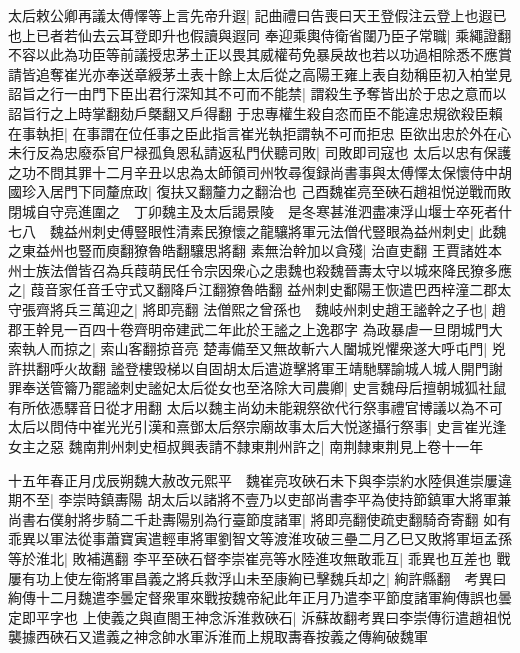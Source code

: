 太后敕公卿再議太傅懌等上言先帝升遐|{
	記曲禮曰告喪曰天王登假注云登上也遐已也上已者若仙去云耳登即升也假讀與遐同}
奉迎乘輿侍衛省闥乃臣子常職|{
	乘繩證翻}
不容以此為功臣等前議授忠茅土正以畏其威權苟免暴戾故也若以功過相除悉不應賞請皆追奪崔光亦奉送章綬茅土表十餘上太后從之高陽王雍上表自劾稱臣初入柏堂見詔旨之行一由門下臣出君行深知其不可而不能禁|{
	謂殺生予奪皆出於于忠之意而以詔旨行之上時掌翻劾戶槩翻又戶得翻}
于忠專權生殺自恣而臣不能違忠規欲殺臣賴在事執拒|{
	在事謂在位任事之臣此指言崔光執拒謂執不可而拒忠}
臣欲出忠於外在心未行反為忠廢忝官尸禄孤負恩私請返私門伏聽司敗|{
	司敗即司寇也}
太后以忠有保護之功不問其罪十二月辛丑以忠為太師領司州牧尋復録尚書事與太傅懌太保懷侍中胡國珍入居門下同釐庶政|{
	復扶又翻釐力之翻治也}
己酉魏崔亮至硤石趙祖悦逆戰而敗閉城自守亮進圍之　丁卯魏主及太后謁景陵　是冬寒甚淮泗盡凍浮山堰士卒死者什七八　魏益州刺史傅豎眼性清素民獠懷之龍驤將軍元法僧代豎眼為益州刺史|{
	此魏之東益州也豎而庾翻獠魯皓翻驤思將翻}
素無治幹加以貪殘|{
	治直吏翻}
王賈諸姓本州士族法僧皆召為兵葭萌民任令宗因衆心之患魏也殺魏晉夀太守以城來降民獠多應之|{
	葭音家任音壬守式又翻降戶江翻獠魯皓翻}
益州刺史鄱陽王恢遣巴西梓潼二郡太守張齊將兵三萬迎之|{
	將即亮翻}
法僧熙之曾孫也　魏岐州刺史趙王謐幹之子也|{
	趙郡王幹見一百四十卷齊明帝建武二年此於王謐之上逸郡字}
為政暴虐一旦閉城門大索執人而掠之|{
	索山客翻掠音亮}
楚毒備至又無故斬六人闔城兇懼衆遂大呼屯門|{
	兇許拱翻呼火故翻}
謐登樓毁梯以自固胡太后遣遊擊將軍王靖馳驛諭城人城人開門謝罪奉送管籥乃罷謐刺史謐妃太后從女也至洛除大司農卿|{
	史言魏母后擅朝城狐社鼠有所依憑驛音日從才用翻}
太后以魏主尚幼未能親祭欲代行祭事禮官博議以為不可太后以問侍中崔光光引漢和熹鄧太后祭宗廟故事太后大悦遂攝行祭事|{
	史言崔光逢女主之惡}
魏南荆州刺史桓叔興表請不隸東荆州許之|{
	南荆隸東荆見上卷十一年}


十五年春正月戊辰朔魏大赦改元熙平　魏崔亮攻硤石未下與李崇約水陸俱進崇屢違期不至|{
	李崇時鎮夀陽}
胡太后以諸將不壹乃以吏部尚書李平為使持節鎮軍大將軍兼尚書右僕射將步騎二千赴夀陽别為行臺節度諸軍|{
	將即亮翻使疏吏翻騎奇寄翻}
如有乖異以軍法從事蕭寶寅遣輕車將軍劉智文等渡淮攻破三壘二月乙巳又敗將軍垣孟孫等於淮北|{
	敗補邁翻}
李平至硤石督李崇崔亮等水陸進攻無敢乖互|{
	乖異也互差也}
戰屢有功上使左衛將軍昌義之將兵救浮山未至康絢已擊魏兵却之|{
	絢許縣翻　考異曰絢傳十二月魏遣李曇定督衆軍來戰按魏帝紀此年正月乃遣李平節度諸軍絢傳誤也曇定即平字也}
上使義之與直閤王神念泝淮救硤石|{
	泝蘇故翻考異曰李崇傳衍遣趙祖悦襲據西硤石又遣義之神念帥水軍泝淮而上規取夀春按義之傳絢破魏軍}


